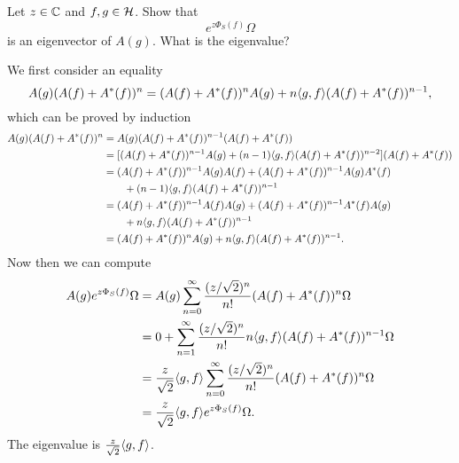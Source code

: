 \documentclass{../../../small}
\begin{document}
\begin{prb}
Let $z\in\mathbb{C}$ and $f,g\in\mathcal{H}$.
Show that
\[e^{z\Phi_S(f)}\Omega\]
is an eigenvector of $A(g)$.
What is the eigenvalue?
\end{prb}
\begin{sol}
We first consider an equality
\[A(g)(A(f)+A^*(f))^n=(A(f)+A^*(f))^nA(g)+n\langle g,f\rangle(A(f)+A^*(f))^{n-1},\]
which can be proved by induction
\begin{align*}
A(g)(A(f)+A^*(f))^n
&=A(g)(A(f)+A^*(f))^{n-1}(A(f)+A^*(f))\\
&=[(A(f)+A^*(f))^{n-1}A(g)+(n-1)\langle g,f\rangle(A(f)+A^*(f))^{n-2}](A(f)+A^*(f))\\
&=(A(f)+A^*(f))^{n-1}A(g)A(f)+(A(f)+A^*(f))^{n-1}A(g)A^*(f)\\
&\qquad+(n-1)\langle g,f\rangle(A(f)+A^*(f))^{n-1}\\
&=(A(f)+A^*(f))^{n-1}A(f)A(g)+(A(f)+A^*(f))^{n-1}A^*(f)A(g)\\
&\qquad+n\langle g,f\rangle(A(f)+A^*(f))^{n-1}\\
&=(A(f)+A^*(f))^nA(g)+n\langle g,f\rangle(A(f)+A^*(f))^{n-1}.
\end{align*}
Now then we can compute
\begin{align*}
A(g)e^{z\Phi_S(f)}\Omega
&=A(g)\sum_{n=0}^\infty\frac{(z/\sqrt2)^n}{n!}(A(f)+A^*(f))^n\Omega\\
&=0+\sum_{n=1}^\infty\frac{(z/\sqrt2)^n}{n!}n\langle g,f\rangle(A(f)+A^*(f))^{n-1}\Omega\\
&=\frac z{\sqrt2}\langle g,f\rangle\sum_{n=0}^\infty\frac{(z/\sqrt2)^n}{n!}(A(f)+A^*(f))^n\Omega\\
&=\frac z{\sqrt2}\langle g,f\rangle e^{z\Phi_S(f)}\Omega.
\end{align*}
The eigenvalue is $\frac z{\sqrt2}\langle g,f\rangle$.
\end{sol}
\end{document}

